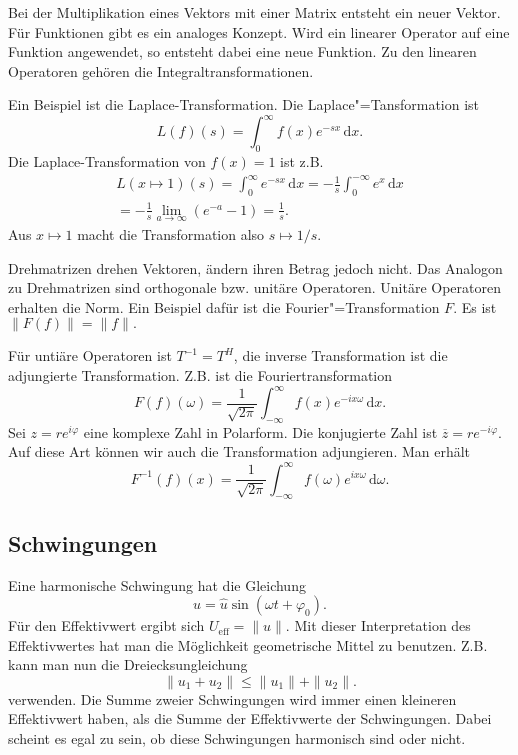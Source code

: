 \documentclass[a4paper,10pt,fleqn,twocolumn,twoside]{article}
\begin{document}
Bei der Multiplikation eines Vektors mit einer Matrix entsteht ein
neuer Vektor. Für Funktionen gibt es ein analoges Konzept. Wird ein
linearer Operator auf eine Funktion angewendet, so entsteht dabei
eine neue Funktion. Zu den linearen Operatoren gehören die
Integraltransformationen.

Ein Beispiel ist die Laplace-Transformation.
Die Laplace"=Tansformation ist
\[L(f)(s) = \int_0^{\infty} f(x)e^{-sx}\,\mathrm dx.\]
Die Laplace-Transformation von \(f(x)=1\) ist z.B.
\begin{gather*}
L(x\mapsto 1)(s) = \int_0^{\infty} e^{-sx}\,\mathrm dx
= -\frac{1}{s} \int_0^{-\infty} e^x\,\mathrm dx\\
= -\frac{1}{s} \lim_{a\rightarrow\infty} (e^{-a}-1)
= \frac{1}{s}.
\end{gather*}
Aus \(x\mapsto 1\) macht die Transformation also
\(s\mapsto 1/s\).



Drehmatrizen drehen Vektoren, ändern ihren Betrag jedoch nicht.
Das Analogon zu Drehmatrizen sind orthogonale bzw. unitäre Operatoren.
Unitäre Operatoren erhalten die Norm. Ein Beispiel dafür ist die
Fourier"=Transformation \(F\). Es ist \(\|F(f)\| = \|f\|.\)

Für untiäre Operatoren ist \(T^{-1}=T^H\), die inverse Transformation
ist die adjungierte Transformation. Z.B. ist die Fouriertransformation
\[F(f)(\omega) = \frac{1}{\sqrt{2\pi}}
\int_{-\infty}^{\infty} f(x)e^{-ix\omega}\,\mathrm dx.\]
Sei \(z=re^{i\varphi}\) eine komplexe Zahl in Polarform.
Die konjugierte Zahl ist
\(\overline z = re^{-i\varphi}\). Auf diese Art können wir auch
die Transformation adjungieren. Man erhält
\[F^{-1}(f)(x) = \frac{1}{\sqrt{2\pi}}
\int_{-\infty}^{\infty} f(\omega)e^{ix\omega}\,\mathrm d\omega.\]

\subsection{Schwingungen}

Eine harmonische Schwingung hat die Gleichung
\[u=\hat u\sin(\omega t+\varphi_0).\]
Für den Effektivwert ergibt sich \(U_\mathrm{eff} = \|u\|\).
Mit dieser Interpretation des Effektivwertes hat man die Möglichkeit
geometrische Mittel zu benutzen. Z.B. kann man nun die
Dreiecksungleichung
\[\|u_1+u_2\| \le \|u_1\|+\|u_2\|.\]
verwenden. Die Summe zweier Schwingungen wird immer einen kleineren
Effektivwert haben, als die Summe der Effektivwerte der Schwingungen.
Dabei scheint es egal zu sein, ob diese Schwingungen harmonisch sind
oder nicht.
\end{document}
